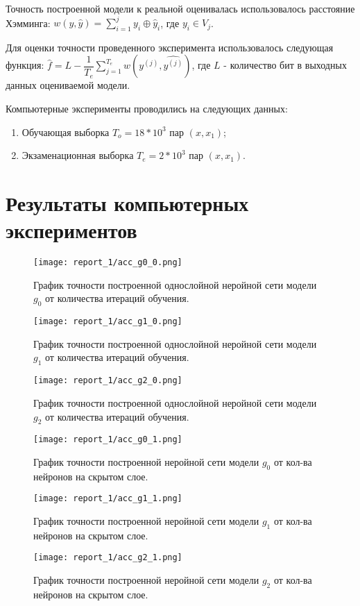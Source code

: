 \documentclass[a4paper,12pt,twoside]{article}
\begin{document}
	
	\noindent Точность построенной модели к реальной оценивалась использовалось расстояние Хэмминга:
	$w(y, \hat{y}) = \sum_{i=1}^{j} y_i \oplus \hat{y}_i$, где $y_i \in V_j$.
	\bigskip
	
	\noindent Для оценки точности проведенного эксперимента использовалось следующая функция:
	$\hat{f} =L - \dfrac{1}{T_e}\sum_{j=1}^{T_e}w(y^{(j)}, \hat{y^{(j)}})$,
	где $L$ - количество бит в выходных данных оцениваемой модели. 

	\bigskip
	\noindent Компьютерные эксперименты проводились на следующих данных:
	\begin{enumerate}
		\item Обучающая выборка $T_o=18 * 10^3$ пар $(x, x_1)$;
		\item Экзаменационная выборка $T_e=2 * 10^3$ пар $(x, x_1)$.
	\end{enumerate}
	
	
	\newpage
	\section{Результаты компьютерных экспериментов}
	
	\begin{figure}[htb!]
	\texttt{[image: report\_1/acc\_g0\_0.png]}
	
	График точности построенной однослойной неройной сети модели $g_0$ от количества итераций обучения.
	
	
	\texttt{[image: report\_1/acc\_g1\_0.png]}
	
	График точности построенной однослойной неройной сети модели $g_1$ от количества итераций обучения.
	
	\end{figure}

	\begin{figure}[h!]
	\texttt{[image: report\_1/acc\_g2\_0.png]}
	
	График точности построенной однослойной неройной сети модели $g_2$ от количества итераций обучения.
	
	\texttt{[image: report\_1/acc\_g0\_1.png]}
	
	График точности построенной неройной сети модели $g_0$ от кол-ва нейронов на скрытом слое.
	\end{figure}
	
	\begin{figure}[h!]
	\texttt{[image: report\_1/acc\_g1\_1.png]}
	
	График точности построенной неройной сети модели $g_1$ от кол-ва нейронов на скрытом слое.

	
	\texttt{[image: report\_1/acc\_g2\_1.png]}
	
	График точности построенной неройной сети модели $g_2$ от кол-ва нейронов на скрытом слое.
	\end{figure}
\end{document}
